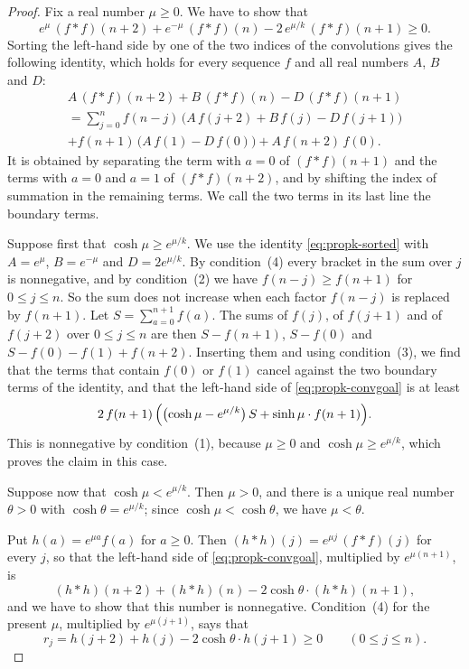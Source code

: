 \documentclass{amsart}
\theoremstyle{definition}
\theoremstyle{remark}
\numberwithin{equation}{section}
\begin{document}
\begin{proof}
Fix a real number $\mu\ge 0$. We have to show that
\begin{equation}\label{eq:propk-convgoal}
e^{\mu}\,(f*f)(n+2)+e^{-\mu}\,(f*f)(n)-2\,e^{\mu/k}\,(f*f)(n+1)\ge 0.
\end{equation}
Sorting the left-hand side by one of the two indices of the convolutions gives the following identity, which holds for every sequence $f$ and all real numbers $A$, $B$ and $D$:
\begin{multline}\label{eq:propk-sorted}
A\,(f*f)(n+2)+B\,(f*f)(n)-D\,(f*f)(n+1)\\
=\sum_{j=0}^{n}f(n-j)\,\bigl(A\,f(j+2)+B\,f(j)-D\,f(j+1)\bigr)\\
+f(n+1)\,\bigl(A\,f(1)-D\,f(0)\bigr)+A\,f(n+2)\,f(0).
\end{multline}
It is obtained by separating the term with $a=0$ of $(f*f)(n+1)$ and the terms with $a=0$ and $a=1$ of $(f*f)(n+2)$, and by shifting the index of summation in the remaining terms. We call the two terms in its last line the boundary terms.

Suppose first that $\cosh\mu\ge e^{\mu/k}$. We use the identity \eqref{eq:propk-sorted} with $A=e^{\mu}$, $B=e^{-\mu}$ and $D=2e^{\mu/k}$. By condition~(4) every bracket in the sum over $j$ is nonnegative, and by condition~(2) we have $f(n-j)\ge f(n+1)$ for $0\le j\le n$. So the sum does not increase when each factor $f(n-j)$ is replaced by $f(n+1)$. Let $S=\sum_{a=0}^{n+1}f(a)$. The sums of $f(j)$, of $f(j+1)$ and of $f(j+2)$ over $0\le j\le n$ are then $S-f(n+1)$, $S-f(0)$ and $S-f(0)-f(1)+f(n+2)$. Inserting them and using condition~(3), we find that the terms that contain $f(0)$ or $f(1)$ cancel against the two boundary terms of the identity, and that the left-hand side of \eqref{eq:propk-convgoal} is at least
\[
2\,f(n+1)\,\Bigl(\bigl(\cosh\mu-e^{\mu/k}\bigr)\,S+\sinh\mu\cdot f(n+1)\Bigr).
\]
This is nonnegative by condition~(1), because $\mu\ge 0$ and $\cosh\mu\ge e^{\mu/k}$, which proves the claim in this case.

Suppose now that $\cosh\mu<e^{\mu/k}$. Then $\mu>0$, and there is a unique real number $\theta>0$ with $\cosh\theta=e^{\mu/k}$; since $\cosh\mu<\cosh\theta$, we have $\mu<\theta$.

Put $h(a)=e^{\mu a}f(a)$ for $a\ge 0$. Then $(h*h)(j)=e^{\mu j}\,(f*f)(j)$ for every $j$, so that the left-hand side of \eqref{eq:propk-convgoal}, multiplied by $e^{\mu(n+1)}$, is
\begin{equation}\label{eq:propk-tilted}
(h*h)(n+2)+(h*h)(n)-2\cosh\theta\cdot(h*h)(n+1),
\end{equation}
and we have to show that this number is nonnegative. Condition~(4) for the present $\mu$, multiplied by $e^{\mu(j+1)}$, says that
\[
r_j=h(j+2)+h(j)-2\cosh\theta\cdot h(j+1)\ge 0\qquad(0\le j\le n).
\]


\end{proof}
\end{document}
